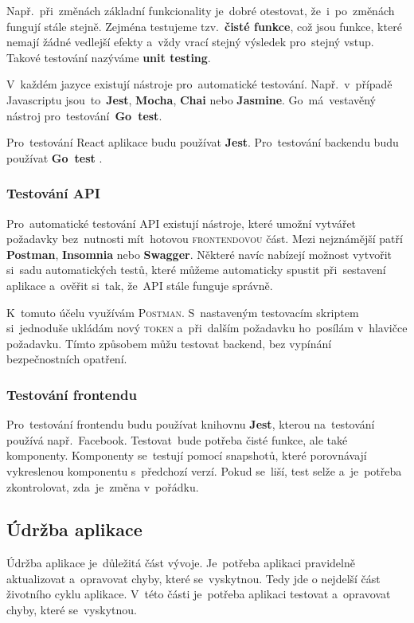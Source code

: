 \documentclass[14pt,a4paper]{article}
\begin{document}
        Např.~při~změnách základní funkcionality je~dobré otestovat, že~i~po~změnách fungují stále stejně. Zejména testujeme tzv.~\textbf{čisté funkce}, což jsou funkce, které nemají žádné vedlejší efekty a~vždy vrací stejný výsledek pro~stejný vstup. Takové testování nazýváme \textbf{unit testing}.
        
        V~každém jazyce existují nástroje pro~automatické testování. Např.~v~případě Javascriptu jsou~to~\textbf{Jest}, \textbf{Mocha}, \textbf{Chai} nebo \textbf{Jasmine}. Go~má~vestavěný nástroj pro~testování~\textbf{Go~test}.
        
        Pro~testování React aplikace budu používat \textbf{Jest}. Pro~testování backendu budu používat \textbf{Go~test} \parencite{jestjsTestingReact}.
        
        \subsubsection{Testování API}
        Pro~automatické testování API existují nástroje, které umožní vytvářet požadavky bez~nutnosti mít~hotovou \textsc{frontendovou} část. Mezi nejznámější patří \textbf{Postman}, \textbf{Insomnia} nebo \textbf{Swagger}. Některé navíc nabízejí možnost vytvořit si~sadu automatických testů, které můžeme automaticky spustit při~sestavení aplikace a~ověřit si~tak, že~API stále funguje správně.

        K~tomuto účelu využívám \textsc{Postman}. S~nastaveným testovacím skriptem si~jednoduše ukládám nový \textsc{token} a~při~dalším požadavku ho~posílám v~hlavičce požadavku. Tímto způsobem můžu testovat backend, bez vypínání bezpečnostních opatření.

        \subsubsection{Testování frontendu}
        Pro~testování frontendu budu používat knihovnu \textbf{Jest}, kterou na~testování používá např.~Facebook. Testovat~bude potřeba čisté funkce, ale také komponenty. Komponenty se~testují pomocí snapshotů, které porovnávají vykreslenou komponentu s~předchozí verzí. Pokud se~liší, test selže a~je~potřeba zkontrolovat, zda~je~změna v~pořádku. \parencite{jestjsTestingReact}

        \subsection{Údržba aplikace}
        Údržba aplikace je~důležitá část vývoje. Je~potřeba aplikaci pravidelně aktualizovat a~opravovat chyby, které se~vyskytnou.
        Tedy jde o nejdelší část životního cyklu aplikace. V~této části je~potřeba aplikaci testovat a~opravovat chyby, které se~vyskytnou.
            
\end{document}
